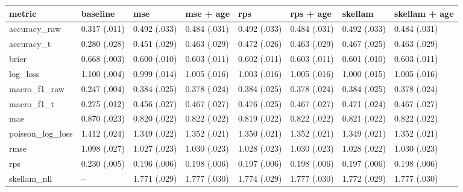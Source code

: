 
\begin{tabular}{llllllll}
\toprule
metric & baseline & mse & mse + age & rps & rps + age & skellam & skellam + age\\
\midrule
accuracy\_raw & 0.317 (.011) & 0.492 (.033) & 0.484 (.031) & 0.492 (.033) & 0.484 (.031) & 0.492 (.033) & 0.484 (.031)\\
accuracy\_t & 0.280 (.028) & 0.451 (.029) & 0.463 (.029) & 0.472 (.026) & 0.463 (.029) & 0.467 (.025) & 0.463 (.029)\\
brier & 0.668 (.003) & 0.600 (.010) & 0.603 (.011) & 0.602 (.011) & 0.603 (.011) & 0.601 (.010) & 0.603 (.011)\\
log\_loss & 1.100 (.004) & 0.999 (.014) & 1.005 (.016) & 1.003 (.016) & 1.005 (.016) & 1.000 (.015) & 1.005 (.016)\\
macro\_f1\_raw & 0.247 (.004) & 0.384 (.025) & 0.378 (.024) & 0.384 (.025) & 0.378 (.024) & 0.384 (.025) & 0.378 (.024)\\
macro\_f1\_t & 0.275 (.012) & 0.456 (.027) & 0.467 (.027) & 0.476 (.025) & 0.467 (.027) & 0.471 (.024) & 0.467 (.027)\\
mae & 0.870 (.023) & 0.820 (.022) & 0.822 (.022) & 0.819 (.022) & 0.822 (.022) & 0.821 (.022) & 0.822 (.022)\\
poisson\_log\_loss & 1.412 (.024) & 1.349 (.022) & 1.352 (.021) & 1.350 (.021) & 1.352 (.021) & 1.349 (.021) & 1.352 (.021)\\
rmse & 1.098 (.027) & 1.027 (.023) & 1.030 (.023) & 1.028 (.023) & 1.030 (.023) & 1.028 (.022) & 1.030 (.023)\\
rps & 0.230 (.005) & 0.196 (.006) & 0.198 (.006) & 0.197 (.006) & 0.198 (.006) & 0.197 (.006) & 0.198 (.006)\\
skellam\_nll & -- & 1.771 (.029) & 1.777 (.030) & 1.774 (.029) & 1.777 (.030) & 1.772 (.029) & 1.777 (.030)\\
\bottomrule
\end{tabular}
